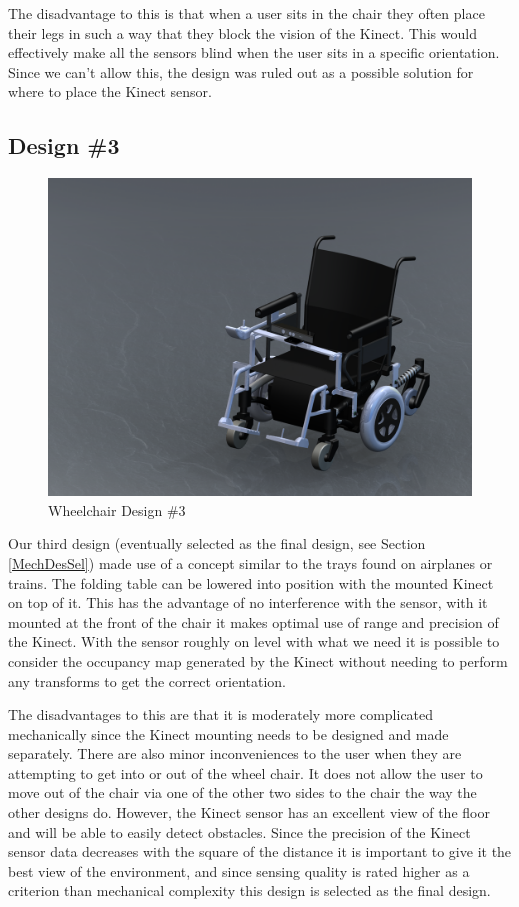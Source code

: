 \documentclass[oneside,final,a4paper]{report}
\begin{document}
The disadvantage to this is that when a user sits in the chair they often place their legs in such a way that they block the vision of the Kinect. This would effectively make all the sensors blind when the user sits in a specific orientation. Since we can’t allow this, the design was ruled out as a possible solution for where to place the Kinect sensor.

\subsection{Design \#3}
\begin{figure}[hbt]
 \centering
 \includegraphics[scale=0.15]{WheelChair_Final}
 \caption{Wheelchair Design \#3}\label{fig:WheelChair_Final}
\end{figure}

Our third design (eventually selected as the final design, see Section \ref{MechDesSel}) made use of a concept similar to the trays found on airplanes or trains. The folding table can be lowered into position with the mounted Kinect on top of it. This has the advantage of no interference with the sensor, with it mounted at the front of the chair it makes optimal use of range and precision of the Kinect. With the sensor roughly on level with what we need it is possible to consider the occupancy map generated by the Kinect without needing to perform any transforms to get the correct orientation.

The disadvantages to this are that it is moderately more complicated mechanically since the Kinect mounting needs to be designed and made separately. There are also minor inconveniences to the user when they are attempting to get into or out of the wheel chair. It does not allow the user to move out of the chair via one of the other two sides to the chair the way the other designs do. However, the Kinect sensor has an excellent view of the floor and will be able to easily detect obstacles. Since the precision of the Kinect sensor data decreases with the square of the distance it is important to give it the best view of the environment, and since sensing quality is rated higher as a criterion than mechanical complexity this design is selected as the final design.
\end{document}
